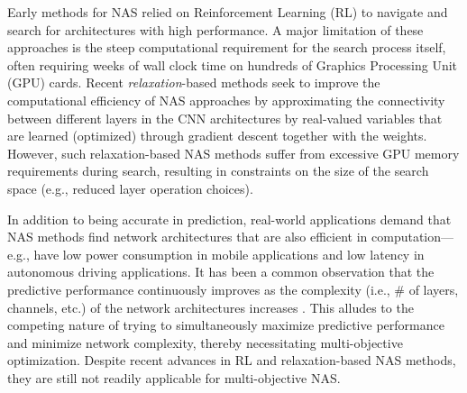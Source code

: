 \documentclass[journal]{IEEEtran}
\theoremstyle{definition}
\theoremstyle{remark}
\begin{document}
\begin{comment}
{\color{blue}
In general, the problem of designing CNN architectures for a target dataset  can be viewed as a bilevel optimization problem \cite{sinha2017review}. It can be mathematically formulated as,

where the upper-level variable  defines a CNN architecture, and the lower-level variable  defines its associated weights. The objective functions  at the upper-level and  at the lower-level denote the loss on the validation data  and the training data , respectively.

The problem in Eq.~(\ref{def:nas}) poses several challenges to conventional optimization methods. First, evaluating  for a given  involves another prolonged optimization process (lower-level optimization), as the relationship between an  and its corresponding optimal  is not analytically defined due to the non-linear nature of modern CNNs. And such a lower-level optimization process needs to repeated for every evaluation of  in the upper-level. Secondly, the upper-level problem is not differentiable, as the gradient of  cannot be reliably computed or even approximated due to the categorical nature of the upper-level variable  involving the choice of \todo[inline]{vb:we have not introduced what  is yet, so it may be hard to understand this line.}layer operations, activation functions, etc.}
\end{comment}

Early methods for NAS relied on Reinforcement Learning (RL) to navigate and search for architectures with high performance. A major limitation of these approaches \cite{zoph2016,nasnet2018} is the steep computational requirement for the search process itself, often requiring weeks of wall clock time on hundreds of Graphics Processing Unit (GPU) cards. Recent \emph{relaxation}-based methods \cite{liu2018darts,xie2018snas,Dong_2019_CVPR,wu2019fbnet} seek to improve the computational efficiency of NAS approaches by approximating the connectivity between different layers in the CNN architectures by real-valued variables that are learned (optimized) through gradient descent together with the weights. However, such relaxation-based NAS methods suffer from excessive GPU memory requirements during search, resulting in constraints on the size of the search space (e.g., reduced layer operation choices).

In addition to being accurate in prediction, real-world applications demand that NAS methods find network architectures that are also efficient in computation---e.g., have low power consumption in mobile applications and low latency in autonomous driving applications. It has been a common observation that the predictive performance continuously  improves as the complexity (i.e., \# of layers, channels, etc.) of the network architectures increases \cite{resnet,densenet,nasnet2018,tan2019efficientnet}. This alludes to the competing nature of trying to simultaneously maximize predictive performance and minimize network complexity, thereby necessitating multi-objective optimization. Despite recent advances in RL and relaxation-based NAS methods, they are still not readily applicable for multi-objective NAS.
\end{document}

